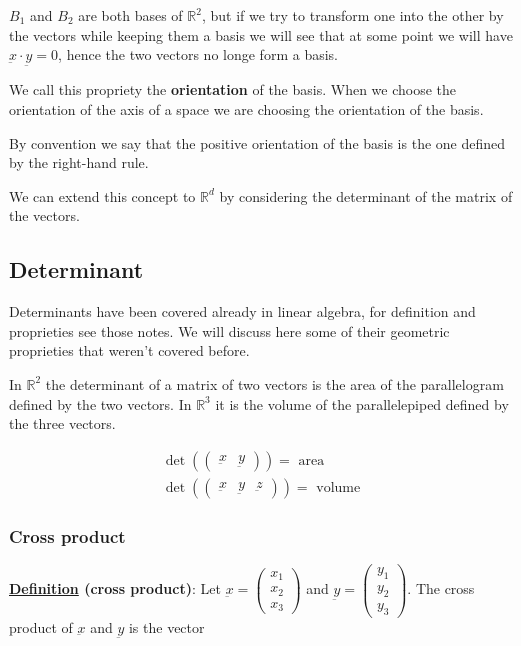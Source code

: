 \documentclass[10pt]{extarticle}
\newcommand{\R}{\mathbb{R}}
\begin{document}
$B_1$ and $B_2$ are both bases of $\R^2$, but if we try to  transform one into the other by  the vectors
while keeping them a basis we will see that at some point we will have $\underbar{x} \cdot \underbar{y} = 0$,
hence the two vectors no longe form a basis.

We call this propriety the \textbf{orientation} of the basis.
When we choose the orientation of the axis of a space we are choosing the orientation of the basis.

By convention we say that the positive orientation of the basis is the one defined by the right-hand rule.

We can extend this concept to $\R^d$ by considering the determinant of the matrix of the vectors.

\subsection{Determinant}

Determinants have been covered already in linear algebra, for definition and proprieties see those notes.
We will discuss here some of their geometric proprieties that weren't covered before.

In $\R^2$ the determinant of a matrix of two vectors is the area of the parallelogram defined by the two vectors.
In $\R^3$ it is the volume of the parallelepiped defined by the three vectors.

\begin{gather*}
    \det \left( \begin{pmatrix}
            \underbar{x} & \underbar{y}
        \end{pmatrix} \right) = \text{ area} \\
    \det \left( \begin{pmatrix}
            \underbar{x} & \underbar{y} & \underbar{z}
        \end{pmatrix} \right) = \text{ volume}
\end{gather*}

\subsubsection{Cross product}

\textbf{\underline{Definition} (cross product)}: Let $\underbar{x} = \begin{pmatrix}
        x_1 \\ x_2 \\ x_3
    \end{pmatrix}$ and $\underbar{y} = \begin{pmatrix}
        y_1 \\ y_2 \\ y_3
    \end{pmatrix}$.
The cross product of $\underbar{x}$ and $\underbar{y}$ is the vector
\end{document}

